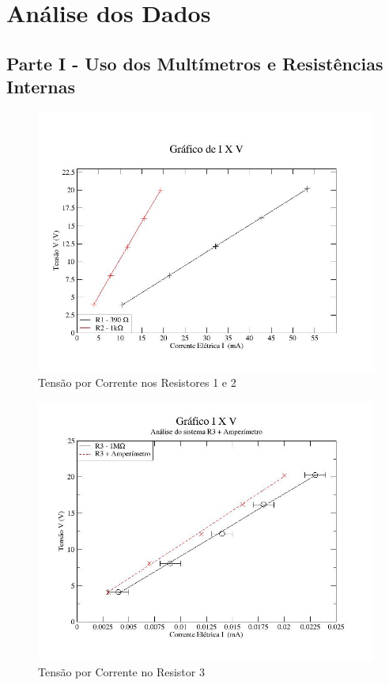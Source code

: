 \documentclass[article]{abntex2}
\begin{document}
\section{Análise dos Dados}
\subsection{Parte I - Uso dos Multímetros e Resistências Internas}
\begin{figure}[htb]
\begin{center}
\caption{Tensão por Corrente nos Resistores 1 e 2}
\includegraphics[scale=0.7]{grafico1,1.jpg} 
\end{center}
\end{figure}

\newpage

\begin{figure}[htb]
\begin{center}
\caption{Tensão por Corrente no Resistor 3}
\includegraphics[scale=0.7]{grafico1,2.jpg} 
\end{center}
\end{figure}
\end{document}

